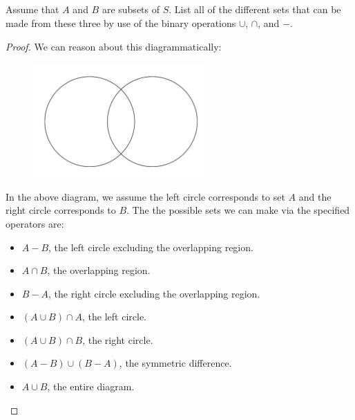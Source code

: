 \documentclass{report}
\begin{document}
\subsection{}%

Assume that $A$ and $B$ are subsets of $S$.
List all of the different sets that can be made from these three by use of the
  binary operations $\cup$, $\cap$, and $-$.

\begin{proof}

  We can reason about this diagrammatically:

  \begin{figure}[ht]
    \includegraphics[width=0.6\textwidth]{venn-diagram}
    \centering
  \end{figure}

  In the above diagram, we assume the left circle corresponds to set $A$ and the
    right circle corresponds to $B$.
  The the possible sets we can make via the specified operators are:

  \begin{itemize}
    \item $A - B$, the left circle excluding the overlapping region.
    \item $A \cap B$, the overlapping region.
    \item $B - A$, the right circle excluding the overlapping region.
    \item $(A \cup B) \cap A$, the left circle.
    \item $(A \cup B) \cap B$, the right circle.
    \item $(A - B) \cup (B - A)$, the symmetric difference.
    \item $A \cup B$, the entire diagram.
  \end{itemize}

\end{proof}

\subsection{}%
\end{document}
